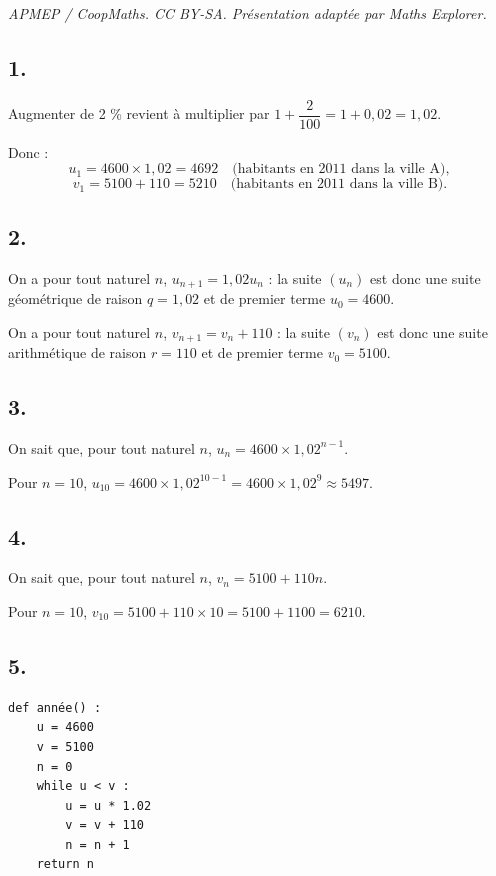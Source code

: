 \documentclass[10pt]{article}
\begin{document}
\noindent\textit{APMEP / CoopMaths. CC BY-SA. Présentation adaptée par Maths Explorer.}\par\medskip
\subsection*{1.}

Augmenter de 2 \% revient à multiplier par \(1 + \dfrac{2}{100} = 1 + 0{,}02 = 1{,}02\).

Donc :
\[
u_1 = 4600 \times 1{,}02 = 4692 \quad \text{(habitants en 2011 dans la ville A)},
\]
\[
v_1 = 5100 + 110 = 5210 \quad \text{(habitants en 2011 dans la ville B)}.
\]

\subsection*{2.}

On a pour tout naturel \(n\), \(u_{n+1} = 1{,}02u_n\) : la suite \((u_n)\) est donc une suite géométrique de raison \(q = 1{,}02\) et de premier terme \(u_0 = 4600\).

On a pour tout naturel \(n\), \(v_{n+1} = v_n + 110\) : la suite \((v_n)\) est donc une suite arithmétique de raison \(r = 110\) et de premier terme \(v_0 = 5100\).

\subsection*{3.}

On sait que, pour tout naturel \(n\), \(u_n = 4600 \times 1{,}02^{n - 1}\).

Pour \(n = 10\), \(u_{10} = 4600 \times 1{,}02^{10 - 1} = 4600 \times 1{,}02^9 \approx 5497\).

\subsection*{4.}

On sait que, pour tout naturel \(n\), \(v_n = 5100 + 110n\).

Pour \(n = 10\), \(v_{10} = 5100 + 110 \times 10 = 5100 + 1100 = 6210\).

\subsection*{5.}

\begin{center}
\begin{lstlisting}[style=python]
def année() :
    u = 4600
    v = 5100
    n = 0
    while u < v :
        u = u * 1.02
        v = v + 110
        n = n + 1
    return n
\end{lstlisting}
\end{center}
\end{document}
